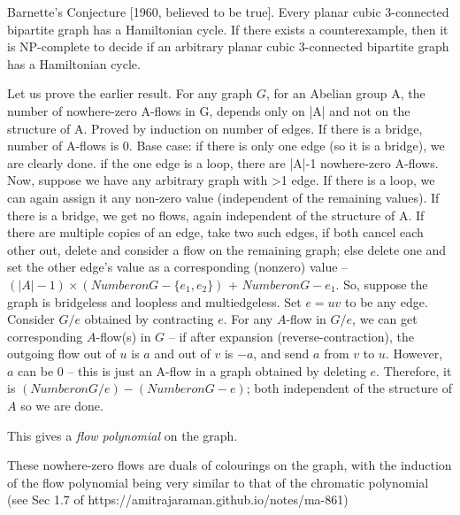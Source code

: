 Barnette's Conjecture [1960, believed to be true]. Every planar cubic 3-connected bipartite graph has a Hamiltonian cycle.
If there exists a counterexample, then it is NP-complete to decide if an arbitrary planar cubic 3-connected bipartite graph has a Hamiltonian cycle.



Let us prove the earlier result. For any graph $G$, for an Abelian group A, the number of nowhere-zero A-flows in G, depends only on |A| and not on the structure of A.
Proved by induction on number of edges.
If there is a bridge, number of A-flows is 0. Base case: if there is only one edge (so it is a bridge), we are clearly done. if the one edge is a loop, there are |A|-1 nowhere-zero A-flows.
Now, suppose we have any arbitrary graph with >1 edge. If there is a loop, we can again assign it any non-zero value (independent of the remaining values). If there is a bridge, we get no flows, again independent of the structure of A. If there are multiple copies of an edge, take two such edges, if both cancel each other out, delete and consider a flow on the remaining graph; else delete one and set the other edge's value as a corresponding (nonzero) value -- $(|A|-1) \times (Number on G - \{e_1,e_2\})$ + $Number on G-e_1$.
So, suppose the graph is bridgeless and loopless and multiedgeless.
Set $e = uv$ to be any edge. Consider $G / e$ obtained by contracting $e$. For any $A$-flow in $G/e$, we can get corresponding $A$-flow(s) in $G$ -- if after expansion (reverse-contraction), the outgoing flow out of $u$ is $a$ and out of $v$ is $-a$, and send $a$ from $v$ to $u$. However, $a$ can be 0 -- this is just an A-flow in a graph obtained by deleting $e$. Therefore, it is $(Number on G/e) - (Number on G-e)$; both independent of the structure of $A$ so we are done.

This gives a \emph{flow polynomial} on the graph.

These nowhere-zero flows are duals of colourings on the graph, with the induction of the flow polynomial being very similar to that of the chromatic polynomial (see Sec 1.7 of https://amitrajaraman.github.io/notes/ma-861)